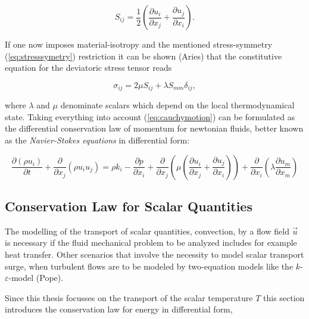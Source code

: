     \begin{displaymath}
      S_{ij} = \frac{1}{2} \left( \frac{\partial u_i}{\partial x_j} + \frac{\partial u_j}{\partial x_i} \right).
    \end{displaymath}

    If one now imposes material-isotropy and the mentioned stress-symmetry (\ref{eq:stresssymetry}) restriction it can be shown (Aries) that the constitutive equation for the deviatoric stress tensor reads 

    \begin{displaymath}
      \sigma_{ij} = 2 \mu S_{ij} + \lambda S_{mm} \delta_{ij},
    \end{displaymath}

    where \(\lambda\) and \(\mu\) denominate scalars which depend on the local thermodynamical state. Taking everything into account (\ref{eq:cauchymotion}) can be formulated as the differential conservation law of momentum for newtonian fluids, better known as the \textit{Navier-Stokes equations} in differential form:

    \begin{equation}
      \label{eq:nsfull}
      \frac{\partial \left(\rho u_i \right)}{\partial t} 
      + \frac{\partial}{\partial x_j} \left( \rho u_i  u_j \right) 
      = \rho k_i
      - \frac{\partial p}{\partial x_i}
      + \frac{\partial}{\partial x_j} \left( \mu  \left( \frac{\partial u_i}{\partial x_j} 
                                              + \frac{\partial u_j}{\partial x_i} \right) \right)
      + \frac{\partial}{\partial x_i} \left(\lambda \frac{\partial u_m}{\partial x_m} \right)
    \end{equation}

    \subsection{Conservation Law for Scalar Quantities}

    The modelling of the transport of scalar quantities, convection, by a flow field \(\vec{u}\) is necessary if the fluid mechanical problem to be analyzed includes for example heat transfer. Other scenarios that involve the necessity to model scalar transport surge, when turbulent flows are to be modeled by two-equation models like the \(k\)-\(\varepsilon\)-model (Pope). 
    
    Since this thesis focusses on the transport of the scalar temperature \(T\) this section introduces the conservation law for energy in differential form,

